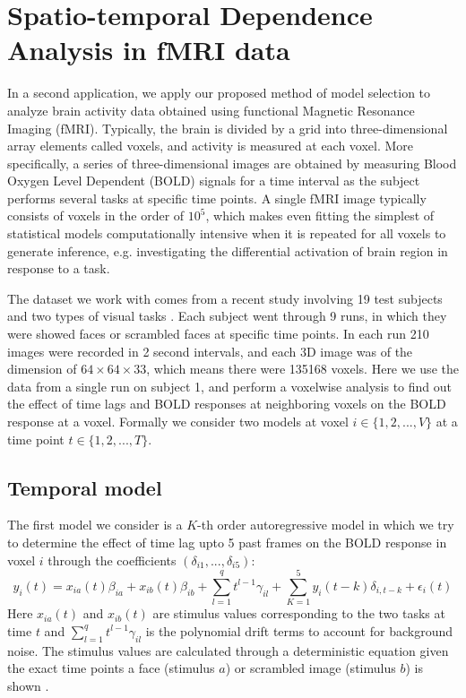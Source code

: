 \section{Spatio-temporal Dependence Analysis in fMRI data}

In a second application, we apply our proposed method of model selection to analyze brain activity data obtained using functional Magnetic Resonance Imaging (fMRI). Typically, the brain is divided by a grid into three-dimensional array elements called voxels, and activity is measured at each voxel. More specifically, a series of three-dimensional images are obtained by measuring Blood Oxygen Level Dependent (BOLD) signals for a time interval as the subject performs several tasks at specific time points. A single fMRI image typically consists of voxels in the order of $10^5$, which makes even fitting the simplest of statistical models computationally intensive when it is repeated for all voxels to generate inference, e.g. investigating the differential activation of brain region in response to a task.

The dataset we work with comes from a recent study involving 19 test subjects and two types of visual tasks \citep{WakemanHenson15}. Each subject went through 9 runs, in which they were showed faces or scrambled faces at specific time points. In each run 210 images were recorded in 2 second intervals, and each 3D image was of the dimension of $64 \times 64 \times 33$, which means there were 135168 voxels. Here we use the data from a single run on subject 1, and perform a voxelwise analysis to find out the effect of time lags and BOLD responses at neighboring voxels on the BOLD response at a voxel. Formally we consider two  models at voxel $i \in \{1,2,...,V\}$ at a time point $t \in \{1,2,...,T\}$.

\subsection{Temporal model} The first model we consider is a $K$-th order autoregressive model in which we try to determine the effect of time lag upto 5 past frames on the BOLD response in voxel $i$ through the coefficients $(\delta_{i1},...,\delta_{i5})$:
%
$$ y_i(t) = x_{ia}(t) \beta_{ia} + x_{ib}(t) \beta_{ib} + \sum_{l=1}^q t^{l-1} \gamma_{il} + \sum_{K=1}^5 y_i(t-k) \delta_{i,t-k} + \epsilon_i(t)
$$
%
\noindent Here $x_{ia}(t)$ and $x_{ib}(t)$ are stimulus values corresponding to the two tasks at time $t$ and $\sum_{l=1}^q t^{l-1} \gamma_{il}$ is the polynomial drift terms to account for background noise. The stimulus values are calculated through a deterministic equation given the exact time points a face (stimulus $a$) or scrambled image (stimulus $b$) is shown \citep{EloyanEtal14}.

